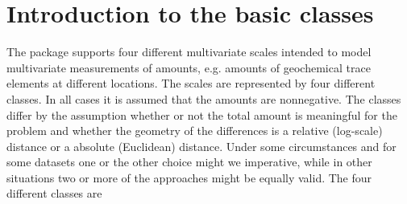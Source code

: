\documentclass{article}
\begin{document}
\section{Introduction to the basic classes}
The package supports four different multivariate scales intended to model
multivariate measurements of amounts, e.g. amounts of geochemical trace
elements at different locations. The scales are represented by four different
classes. In all cases it is assumed that the amounts are nonnegative. The
classes differ by the assumption whether or not the total amount is meaningful
for the problem and whether the geometry of the differences is a relative
(log-scale) distance or a absolute (Euclidean) distance. Under some
circumstances and for some datasets one or the other choice might we
imperative, while in other situations two or more of the approaches might be
equally valid. The four different classes are
\end{document}
